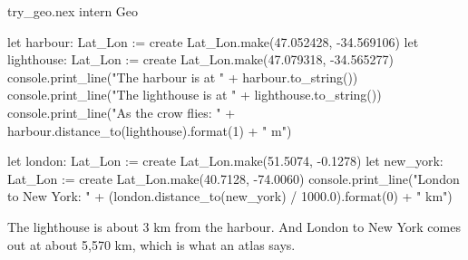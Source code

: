 \begin{tryit}{try_geo.nex}
intern Geo

let harbour: Lat_Lon := create Lat_Lon.make(47.052428, -34.569106)
let lighthouse: Lat_Lon := create Lat_Lon.make(47.079318, -34.565277)
console.print_line("The harbour is at " + harbour.to_string())
console.print_line("The lighthouse is at " + lighthouse.to_string())
console.print_line("As the crow flies: " + harbour.distance_to(lighthouse).format(1) + " m")

let london: Lat_Lon := create Lat_Lon.make(51.5074, -0.1278)
let new_york: Lat_Lon := create Lat_Lon.make(40.7128, -74.0060)
console.print_line("London to New York: " + (london.distance_to(new_york) / 1000.0).format(0) + " km")
\end{tryit}

The lighthouse is about 3 km from the harbour. And London to New York
comes out at about 5,570 km, which is what an atlas says.
